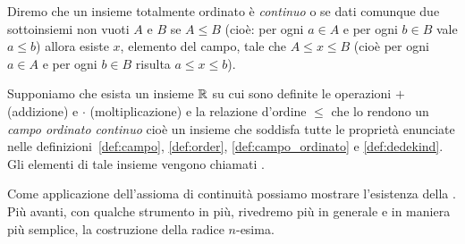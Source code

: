 \begin{definition}
\label{def:dedekind}
\mymark{***}
Diremo che un insieme totalmente ordinato è
\emph{continuo} o 
se
dati comunque due sottoinsiemi non vuoti $A$ e $B$ se $A \le B$
(cioè: per ogni $a \in A$ e per ogni $b\in B$ vale $a\le b$) allora esiste
$x$, elemento del campo, tale che $A\le x \le B$ (cioè per ogni $a\in A$ e per ogni $b\in B$
risulta $a\le x \le b$).
\end{definition}

\begin{axiom}
Supponiamo che esista un insieme $\RR$
\mymargin{$\RR$}%
su cui sono definite le
operazioni $+$ (addizione) e $\cdot$ (moltiplicazione)
e la relazione d'ordine $\le$ che
lo rendono un \emph{campo ordinato continuo} cioè
un insieme che soddisfa tutte le proprietà enunciate
nelle definizioni~\ref{def:campo},
\ref{def:order}, \ref{def:campo_ordinato} e \ref{def:dedekind}.
Gli elementi di tale insieme vengono chiamati .
\end{axiom}

Come applicazione dell'assioma di continuità possiamo mostrare l'esistenza
della .
Più avanti, con qualche strumento in più, rivedremo più in generale
e in maniera più semplice, la costruzione della radice $n$-esima.

